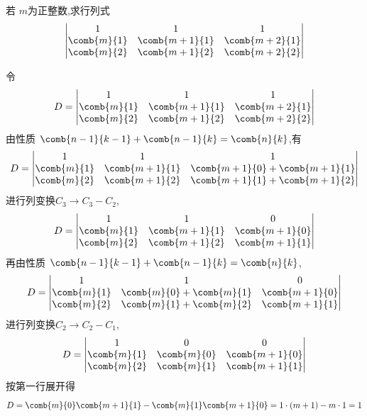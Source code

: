 \begin{questions}
    \question  若 $m$为正整数,求行列式 \[
        \begin{vmatrix}
        1 & 1 & 1 \\
        \comb{m}{1} & \comb{m+1}{1} & \comb{m+2}{1} \\
        \comb{m}{2} & \comb{m+1}{2} & \comb{m+2}{2}
        \end{vmatrix}
        \]
    \begin{solution}
        令\[
        D=\begin{vmatrix}
        1 & 1 & 1 \\
        \comb{m}{1} & \comb{m+1}{1} & \comb{m+2}{1} \\
        \comb{m}{2} & \comb{m+1}{2} & \comb{m+2}{2}
        \end{vmatrix}
        \]
        由性质 $\comb{n-1}{k-1}+\comb{n-1}{k}=\comb{n}{k}$,有\[
        D=\begin{vmatrix}
        1 & 1 & 1 \\
        \comb{m}{1} & \comb{m+1}{1} & \comb{m+1}{0}+\comb{m+1}{1} \\
        \comb{m}{2} & \comb{m+1}{2} & \comb{m+1}{1}+\comb{m+1}{2}
        \end{vmatrix} 
        \]
        进行列变换$C_3\rightarrow C_3-C_2,$\[
        D=\begin{vmatrix}
        1 & 1 & 0 \\
        \comb{m}{1} & \comb{m+1}{1} & \comb{m+1}{0} \\
        \comb{m}{2} & \comb{m+1}{2} & \comb{m+1}{1}
        \end{vmatrix} 
        \]
        再由性质 $\comb{n-1}{k-1}+\comb{n-1}{k}=\comb{n}{k}$,\[
        D=\begin{vmatrix}
        1 & 1 & 0 \\
        \comb{m}{1} & \comb{m}{0}+\comb{m}{1} & \comb{m+1}{0} \\
        \comb{m}{2} & \comb{m}{1}+\comb{m}{2} & \comb{m+1}{1}
        \end{vmatrix} 
        \]
        进行列变换$C_2\rightarrow C_2-C_1,$\[
        D=\begin{vmatrix}
        1 & 0 & 0 \\
        \comb{m}{1} & \comb{m}{0} & \comb{m+1}{0} \\
        \comb{m}{2} & \comb{m}{1} & \comb{m+1}{1}
        \end{vmatrix} 
        \]
        按第一行展开得\[
        D= \comb{m}{0}\comb{m+1}{1}-\comb{m}{1}\comb{m+1}{0}=1\cdot(m+1)-m\cdot1=1
        \]
    \end{solution}


\end{questions}
